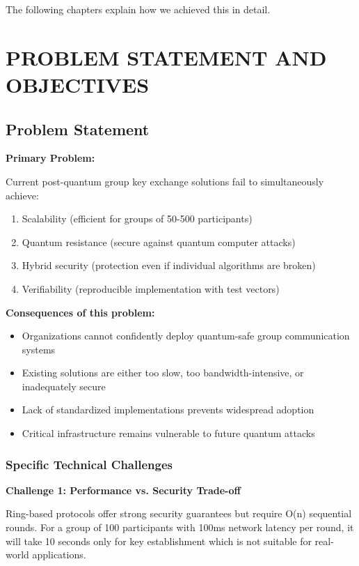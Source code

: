 \documentclass[12pt,a4paper]{report}
\begin{document}
The following chapters explain how we achieved this in detail.

\chapter{PROBLEM STATEMENT AND OBJECTIVES}

\section{Problem Statement}

\textbf{Primary Problem:}

Current post-quantum group key exchange solutions fail to simultaneously achieve:
\begin{enumerate}
\item Scalability (efficient for groups of 50-500 participants)
\item Quantum resistance (secure against quantum computer attacks)
\item Hybrid security (protection even if individual algorithms are broken)
\item Verifiability (reproducible implementation with test vectors)
\end{enumerate}

\textbf{Consequences of this problem:}
\begin{itemize}
\item Organizations cannot confidently deploy quantum-safe group communication systems
\item Existing solutions are either too slow, too bandwidth-intensive, or inadequately secure
\item Lack of standardized implementations prevents widespread adoption
\item Critical infrastructure remains vulnerable to future quantum attacks
\end{itemize}

\subsection{Specific Technical Challenges}

\textbf{Challenge 1: Performance vs. Security Trade-off}

Ring-based protocols offer strong security guarantees but require O(n) sequential rounds. For a group of 100 participants with 100ms network latency per round, it will take 10 seconds only for key establishment which is not suitable for real-world applications.
\end{document}

